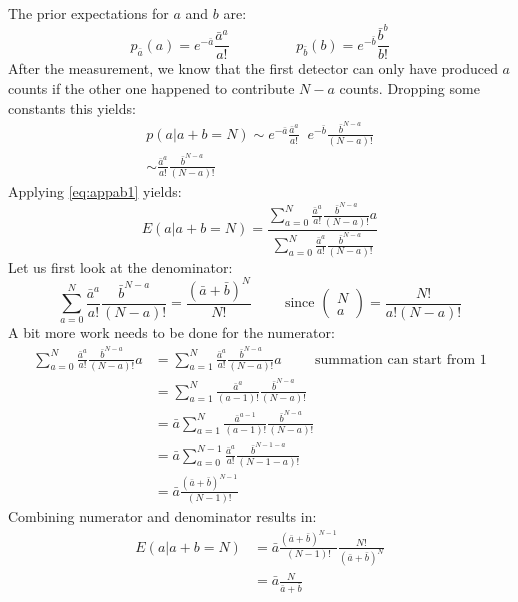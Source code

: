 \documentclass[11pt,oneside]{book}
\begin{document}
The prior expectations for $a$ and $b$ are:
\begin{equation}
  p_{\bar{a}}(a) = e^{-\bar{a}} \frac{\bar{a}^a}{a!} \hspace{2cm}
  p_{\bar{b}}(b) = e^{-\bar{b}} \frac{\bar{b}^b}{b!}
\end{equation}
After the measurement, we know that the first detector can only have produced
$a$ counts if the other one happened to contribute $N-a$ counts. Dropping some
constants this yields:
\begin{align}
  p(a | a + b = N) \sim e^{-\bar{a}} \frac{\bar{a}^a}{a!} \;\;
                        e^{-\bar{b}} \frac{\bar{b}^{N-a}}{(N-a)!}\\
    \sim \frac{\bar{a}^a}{a!} \frac{\bar{b}^{N-a}}{(N-a)!}
\end{align}
Applying \ref{eq:appab1} yields:
\begin{equation}
  E(a | a+b=N)
  = \frac{\sum_{a=0}^N \frac{\bar{a}^a}{a!} \frac{\bar{b}^{N-a}}{(N-a)!} a}
         {\sum_{a=0}^N \frac{\bar{a}^a}{a!} \frac{\bar{b}^{N-a}}{(N-a)!}}
\end{equation}
Let us first look at the denominator:
\begin{equation}
  \sum_{a=0}^N \frac{\bar{a}^a}{a!} \frac{\bar{b}^{N-a}}{(N-a)!}
  = \frac{(\bar{a} + \bar{b})^N}{N!}
\hspace{1cm} \mbox{since } \left( \begin{array}{cc} N\\a \end{array}\right)
   = \frac{N!}{a! (N-a)!}
\end{equation}
A bit more work needs to be done for the numerator:
\begin{align}
 \sum_{a=0}^N \frac{\bar{a}^a}{a!} \frac{\bar{b}^{N-a}}{(N-a)!} a
  & = \sum_{a=1}^N \frac{\bar{a}^a}{a!} \frac{\bar{b}^{N-a}}{(N-a)!} a
    \hspace{1cm} \mbox{summation can start from 1}\\
  & = \sum_{a=1}^N \frac{\bar{a}^a}{(a-1)!} \frac{\bar{b}^{N-a}}{(N-a)!}\\
  & = \bar{a} \sum_{a=1}^N \frac{\bar{a}^{a-1}}{(a-1)!}
                             \frac{\bar{b}^{N-a}}{(N-a)!}\\
  & = \bar{a} \sum_{a=0}^{N-1} \frac{\bar{a}^a}{a!} 
                                 \frac{\bar{b}^{N-1-a}}{(N-1-a)!}\\
  & = \bar{a} \frac{(\bar{a} + \bar{b})^{N-1}}{(N-1)!}
\end{align}
Combining numerator and denominator results in:
\begin{align}
  E(a | a+b=N) &= \bar{a} \frac{(\bar{a} + \bar{b})^{N-1}}{(N-1)!}
                     \frac{N!}{(\bar{a} + \bar{b})^N}\\
  &= \bar{a} \frac{N}{\bar{a} + \bar{b}}
\end{align}
\end{document}
